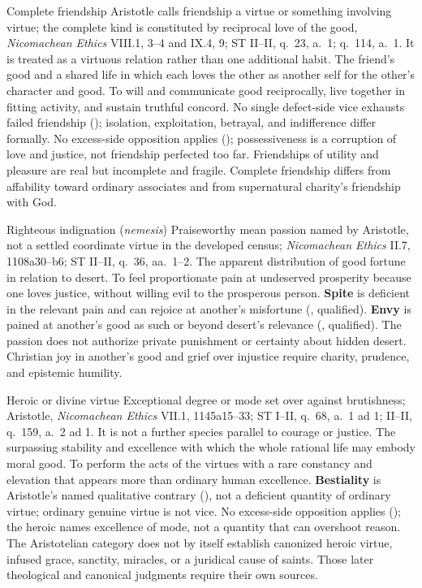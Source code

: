 \virtuedossier
  {Complete friendship}
  {Aristotle calls friendship a virtue or something involving virtue; the complete kind is constituted by reciprocal love of the good, \emph{Nicomachean Ethics} VIII.1, 3--4 and IX.4, 9; ST II--II, q.~23, a.~1; q.~114, a.~1. It is treated as a virtuous relation rather than one additional habit.}
  {The friend's good and a shared life in which each loves the other as another self for the other's character and good.}
  {To will and communicate good reciprocally, live together in fitting activity, and sustain truthful concord.}
  {No single defect-side vice exhausts failed friendship (); isolation, exploitation, betrayal, and indifference differ formally.}
  {No excess-side opposition applies (); possessiveness is a corruption of love and justice, not friendship perfected too far.}
  {Friendships of utility and pleasure are real but incomplete and fragile. Complete friendship differs from affability toward ordinary associates and from supernatural charity's friendship with God.}

\virtuedossier
  {Righteous indignation (\emph{nemesis})}
  {Praiseworthy mean passion named by Aristotle, not a settled coordinate virtue in the developed census; \emph{Nicomachean Ethics} II.7, 1108a30--b6; ST II--II, q.~36, aa.~1--2.}
  {The apparent distribution of good fortune in relation to desert.}
  {To feel proportionate pain at undeserved prosperity because one loves justice, without willing evil to the prosperous person.}
  {\textbf{Spite} is deficient in the relevant pain and can rejoice at another's misfortune (, qualified).}
  {\textbf{Envy} is pained at another's good as such or beyond desert's relevance (, qualified).}
  {The passion does not authorize private punishment or certainty about hidden desert. Christian joy in another's good and grief over injustice require charity, prudence, and epistemic humility.}

\virtuedossier
  {Heroic or divine virtue}
  {Exceptional degree or mode set over against brutishness; Aristotle, \emph{Nicomachean Ethics} VII.1, 1145a15--33; ST I--II, q.~68, a.~1 ad 1; II--II, q.~159, a.~2 ad 1. It is not a further species parallel to courage or justice.}
  {The surpassing stability and excellence with which the whole rational life may embody moral good.}
  {To perform the acts of the virtues with a rare constancy and elevation that appears more than ordinary human excellence.}
  {\textbf{Bestiality} is Aristotle's named qualitative contrary (), not a deficient quantity of ordinary virtue; ordinary genuine virtue is not vice.}
  {No excess-side opposition applies (); the heroic names excellence of mode, not a quantity that can overshoot reason.}
  {The Aristotelian category does not by itself establish canonized heroic virtue, infused grace, sanctity, miracles, or a juridical cause of saints. Those later theological and canonical judgments require their own sources.}

